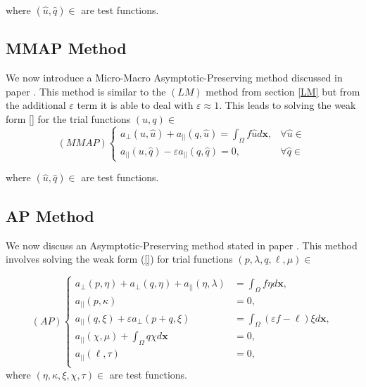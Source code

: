 \documentclass[12pt,a4paper]{article}
\begin{document}
where $(\hat{u}, \hat{q}) \in $ are test functions.

\subsection{MMAP Method} \label{MMAP}
We now introduce a Micro-Macro Asymptotic-Preserving method discussed in paper \cite{}. This method is similar to the $(LM)$ method from section \ref{LM} but from the additional $\varepsilon$ term it is able to deal with $\varepsilon \approx 1$. This leads to solving the weak form \ref{} for the trial functions $(u, q) \in $ 
\begin{equation}
(MMAP)
\begin{cases}
a_{\perp}(u, \hat{u}) + a_{||}(q, \hat{u}) = \int_{\Omega} f \hat{u} d\mathbf{x}, 
&\forall \hat{u} \in \\
a_{||}(u, \hat{q}) - \varepsilon a_{||}(q, \hat{q}) = 0, & \forall \hat{q} \in 
\end{cases}
\end{equation}

where $(\hat{u}, \hat{q}) \in $ are test functions.

\subsection{AP Method} \label{AP}
We now discuss an Asymptotic-Preserving method stated in paper \cite{}. This method involves solving the weak form (\ref{}) for trial functions $(p, \lambda, q, \ell, \mu) \in $

\begin{equation}
(AP)
\begin{cases}
a_{\perp}(p, \eta)+a_{\perp}(q, \eta) + a_{||}(\eta, \lambda) &= \int_{\Omega}f \eta d\mathbf{x},
\\
 a_{||}(p, \kappa) &= 0, 
 \\
 a_{||}(q, \xi) + \varepsilon a_{\perp}(p+q, \xi) &= 
 \int_{\Omega} (\varepsilon f -\ell)\xi d\mathbf{x},
 \\
 a_{||}(\chi, \mu) + \int_{\Omega}q \chi d\mathbf{x} &= 0,
 \\
 a_{||}(\ell, \tau) &= 0,
 \\
\end{cases}
\end{equation}
where $(\eta, \kappa, \xi, \chi, \tau)\in$ are test functions.
\end{document}
